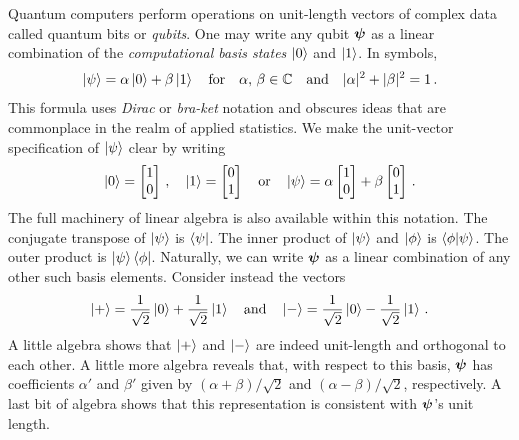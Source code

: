 \documentclass[12pt]{article} %
\begin{document}
Quantum computers perform operations on unit-length vectors of complex data called quantum bits or \emph{qubits}.  One may write any qubit $\boldsymbol{\psi}$ as a linear combination of the \emph{computational basis states} $\ket{0}$ and $\ket{1}$.  In symbols,
\begin{align*}
	\ket{\psi} = \alpha \ket{0} + \beta \ket{1} \quad \mbox{for} \quad \alpha, \, \beta \in \mathbb{C} \quad \mbox{and} \quad  |\alpha|^2 + |\beta|^2 = 1\, .
\end{align*}
This formula uses \emph{Dirac} or \emph{bra-ket} notation and obscures ideas that are commonplace in the realm of applied statistics. We make the unit-vector specification of $\ket{\psi}$ clear by writing
\begin{align*}
	\ket{0}=\begin{bmatrix}
		1 \\ 0
	\end{bmatrix} \, ,  \quad \ket{1}=\begin{bmatrix}
		0 \\ 1
	\end{bmatrix} \quad \mbox{or} \quad \ket{\psi} = \alpha \begin{bmatrix}
		1 \\ 0
	\end{bmatrix} + \beta  \begin{bmatrix}
		0 \\ 1
	\end{bmatrix}\, .
\end{align*} 
The full machinery of linear algebra is also available within this notation. The conjugate transpose of $\ket{\psi}$ is $\bra{\psi}$. The inner product of $\ket{\psi}$ and $\ket{\phi}$ is $\braket{\phi|\psi}$. The outer product is $\ket{\psi}\bra{\phi}$. Naturally, we can write $\boldsymbol{\psi}$ as a linear combination of any other such basis elements. Consider instead the vectors
\begin{align*}
	\ket{+} = \frac{1}{\sqrt{2}} \ket{0} + \frac{1}{\sqrt{2}} \ket{1} \quad \mbox{and} \quad \ket{-} = \frac{1}{\sqrt{2}} \ket{0} - \frac{1}{\sqrt{2}} \ket{1} \, .
\end{align*}
A little algebra shows that $\ket{+}$ and $\ket{-}$ are indeed unit-length and orthogonal to each other. A little more algebra reveals that, with respect to this basis, $\boldsymbol{\psi}$ has coefficients $\alpha'$ and $\beta'$ given by $(\alpha + \beta)/\sqrt{2}$ and $(\alpha - \beta)/\sqrt{2}$, respectively. A last bit of algebra shows that this representation is consistent with $\boldsymbol{\psi}$'s unit length.
\end{document}
